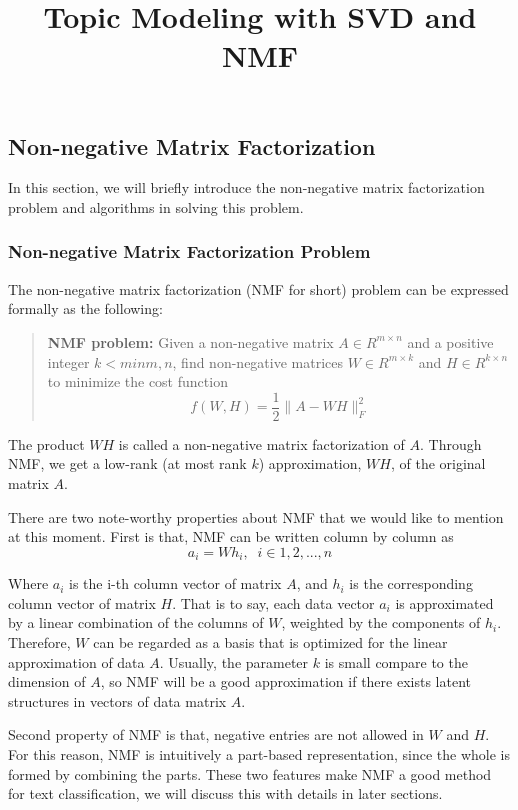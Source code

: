 \documentclass[12pt,letterpaper]{article}
\title{Topic Modeling with SVD and NMF}
\author{}
\begin{document}
\maketitle
\subsection{Non-negative Matrix Factorization} 
In this section, we will briefly introduce the non-negative matrix factorization problem and algorithms in solving this problem. 
\subsubsection{Non-negative Matrix Factorization Problem}
The non-negative matrix factorization (NMF for short) problem can be expressed formally as the following: 
\begin{quotation}
	\noindent \textbf{NMF problem:} Given a non-negative matrix $A\in R^{m\times n}$ and a positive integer $k < min{m, n}$, find non-negative matrices $W \in R^{m\times k}$ and $H \in R^{k \times n}$ to minimize the cost function
	\begin{equation}
	f(W, H) = \frac{1}{2}\|A-WH\|_F^2
	\end{equation} 
\end{quotation} 

The product $WH$ is called a non-negative matrix factorization of $A$. Through NMF, we get a low-rank (at most rank $k$) approximation, $WH$, of the original matrix $A$. 

There are two note-worthy properties about NMF that we would like to mention at this moment. First is that, NMF can be written column by column as
\begin{equation}
a_i = Wh_i, \;\; i \in {1, 2, ..., n}
\end{equation}

Where $a_i$ is the i-th column vector of matrix $A$, and $h_i$ is the corresponding column vector of matrix $H$. That is to say, each data vector $a_i$ is approximated by a linear combination of the columns of $W$, weighted by the components of $h_i$. Therefore, $W$ can be regarded as a basis that is optimized for the linear approximation of data $A$. Usually, the parameter $k$ is small compare to the dimension of $A$, so NMF will be a good approximation if there exists latent structures in vectors of data matrix $A$. 

Second property of NMF is that, negative entries are not allowed in $W$ and $H$. For this reason, NMF is intuitively a part-based representation, since the whole is formed by combining the parts. These two features make NMF a good method for text classification, we will discuss this with details in later sections. 
\end{document}
